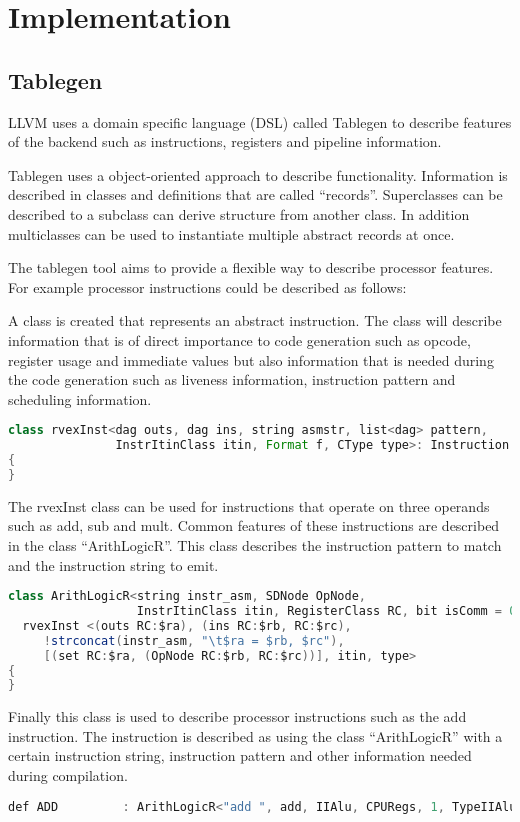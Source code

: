 \chapter{Implementation}
\label{chap:implementation}
\section{Tablegen}
LLVM uses a domain specific language (DSL) called Tablegen to describe features of the backend such as instructions, registers and pipeline information. 

Tablegen uses a object-oriented approach to describe functionality. Information is described in classes and definitions that are called “records”. Superclasses can be described to a subclass can derive structure from another class. In addition multiclasses can be used to instantiate multiple abstract records at once.

The tablegen tool aims to provide a flexible way to describe processor features. For example processor instructions could be described as follows:

A class is created that represents an abstract instruction. The class will describe information that is of direct importance to code generation such as opcode, register usage and immediate values but also information that is needed during the code generation such as liveness information, instruction pattern and scheduling information.

\begin{lstlisting}[language=java]
class rvexInst<dag outs, dag ins, string asmstr, list<dag> pattern,
               InstrItinClass itin, Format f, CType type>: Instruction
{
}
\end{lstlisting}

The rvexInst class can be used for instructions that operate on three operands such as add, sub and mult. Common features of these instructions are described in the class “ArithLogicR”. This class describes the instruction pattern to match and the instruction string to emit. 
\begin{lstlisting}[language=java]
class ArithLogicR<string instr_asm, SDNode OpNode,
                  InstrItinClass itin, RegisterClass RC, bit isComm = 0, CType type>:
  rvexInst <(outs RC:$ra), (ins RC:$rb, RC:$rc),
     !strconcat(instr_asm, "\t$ra = $rb, $rc"),
     [(set RC:$ra, (OpNode RC:$rb, RC:$rc))], itin, type> 
{
}
\end{lstlisting}

Finally this class is used to describe processor instructions such as the add instruction. The instruction is described as using the class “ArithLogicR” with a certain instruction string, instruction pattern and other information needed during compilation.
\begin{lstlisting}[language=java]
def ADD         : ArithLogicR<"add ", add, IIAlu, CPURegs, 1, TypeIIAlu>;
\end{lstlisting}

